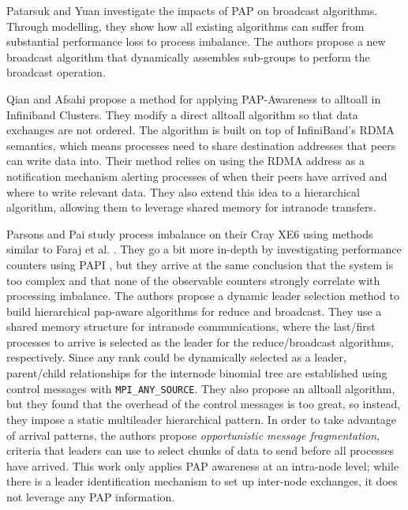 Patarsuk and Yuan \cite{Patarasuk2008EffBcastDifProcArr} investigate the impacts of PAP on broadcast algorithms.
Through modelling, they show how all existing algorithms can suffer from substantial performance loss to process imbalance. 
The authors propose a new broadcast algorithm that dynamically assembles sub-groups to perform the broadcast operation.

Qian and Afsahi \cite{Qian2009ProcArrivalSHMA2AIB} propose a method for applying PAP-Awareness to alltoall in Infiniband Clusters.
They modify a direct alltoall algorithm so that data exchanges are not ordered.
The algorithm is built on top of InfiniBand's RDMA semantics, which means processes need to share destination addresses that peers can write data into. 
Their method relies on using the RDMA address as a notification mechanism alerting processes of when their peers have arrived and where to write relevant data.
They also extend this idea to a hierarchical algorithm, allowing them to leverage shared memory for intranode transfers.

Parsons and Pai \cite{Parsons2015ExpProcImbMPICollHierarcialSys} study process imbalance on their Cray XE6 using methods similar to Faraj et al. \cite{Faraj2008StudyProcArrivalMPIColl}.
They go a bit more in-depth by investigating performance counters using PAPI \cite{Mucci1999PAPI}, but they arrive at the same conclusion that the system is too complex and that none of the observable counters strongly correlate with processing imbalance. 
The authors propose a dynamic leader selection method to build hierarchical pap-aware algorithms for reduce and broadcast.
They use a shared memory structure for intranode communications, where the last/first processes to arrive is selected as the leader for the reduce/broadcast algorithms, respectively. 
Since any rank could be dynamically selected as a leader, parent/child relationships for the internode binomial tree are established using control messages with \texttt{MPI\_ANY\_SOURCE}. 
They also propose an alltoall algorithm, but they found that the overhead of the control messages is too great, so instead, they impose a static multileader hierarchical pattern.
In order to take advantage of arrival patterns, the authors propose \textit{opportunistic message fragmentation}, criteria that leaders can use to select chunks of data to send before all processes have arrived.
This work only applies PAP awareness at an intra-node level; while there is a leader identification mechanism to set up inter-node exchanges, it does not leverage any PAP information.

